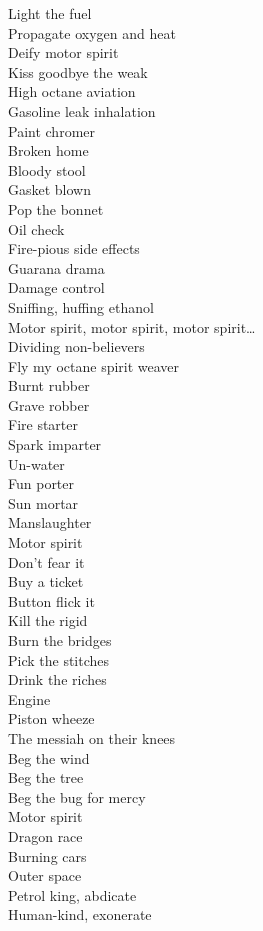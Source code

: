 Light the fuel\\
Propagate oxygen and heat\\
Deify motor spirit\\
Kiss goodbye the weak\\

High octane aviation\\
Gasoline leak inhalation\\
Paint chromer\\
Broken home\\
Bloody stool\\
Gasket blown\\
Pop the bonnet\\
Oil check\\
Fire-pious side effects\\
Guarana drama\\
Damage control\\
Sniffing, huffing ethanol\\

Motor spirit, motor spirit, motor spirit…\\

Dividing non-believers\\
Fly my octane spirit weaver\\

Burnt rubber\\
Grave robber\\
Fire starter\\
Spark imparter\\
Un-water\\
Fun porter\\
Sun mortar\\
Manslaughter\\
Motor spirit\\
Don't fear it\\
Buy a ticket\\
Button flick it\\
Kill the rigid\\
Burn the bridges\\
Pick the stitches\\
Drink the riches\\

Engine \\
Piston wheeze\\
The messiah on their knees\\
Beg the wind\\
Beg the tree\\
Beg the bug for mercy\\
Motor spirit\\
Dragon race\\
Burning cars\\
Outer space\\
Petrol king, abdicate\\
Human-kind, exonerate\\

